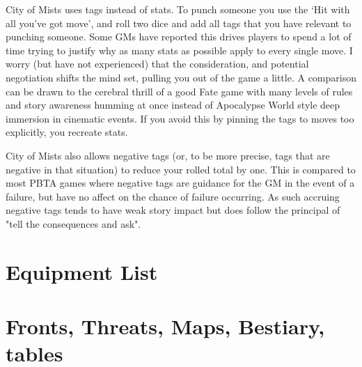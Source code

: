 \documentclass{tufte-handout}
\begin{document}
City of Mists uses tags instead of stats. To punch someone you use the `Hit with all you've got move', and roll two dice and add all tags that you have relevant to punching someone. Some GMs have reported this drives players to spend a lot of time trying to justify why as many stats as possible apply to every single move. I worry (but have not experienced) that the consideration, and potential negotiation shifts the mind set, pulling you out of the game a little. A comparison can be drawn to the cerebral thrill of a good Fate game with many levels of rules and story awareness humming at once instead of Apocalypse World style deep immersion in cinematic events. If you avoid this by pinning the tags to moves too explicitly, you recreate stats.

City of Mists also allows negative tags (or, to be more precise, tags that are negative in that situation) to reduce your rolled total by one. This is compared to most PBTA games where negative tags are guidance for the GM in the event of a failure, but have no affect on the chance of failure occurring. As such accruing negative tags tends to have weak story impact but does follow the principal of "tell the consequences and ask". 

\section{Equipment List}

\section{Fronts, Threats, Maps, Bestiary, tables}
\end{document}
